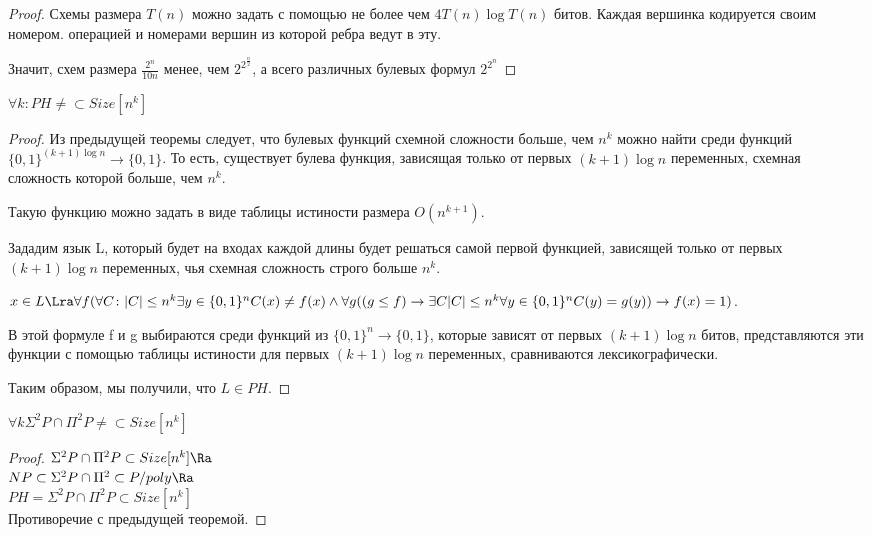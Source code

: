 \begin{proof}
	Схемы размера $T(n)$ можно задать с помощью не более
	чем $4T(n) \log T(n)$  битов. Каждая вершинка кодируется
	своим номером. операцией и номерами вершин из которой ребра ведут в эту. 

	Значит, схем размера $\frac{2^{n}}{10n}$ менее, чем $2^{2^{\frac{n}{2}}}$, 
	а всего различных булевых формул $2^{2^n}$
\end{proof}


\begin{theorem}
	$\forall k \colon PH \ne \subset Size[n^k]$\\
\end{theorem}
\begin{proof}
	Из предыдущей теоремы следует, что булевых функций схемной
	сложности больше, чем $n^k$ можно найти среди функций 
	$\{0, 1\}^{(k + 1)\log n}\to \{0, 1\}$. То есть, существует 
	булева функция, зависящая только от первых $(k + 1)\log n$ 
	переменных, схемная сложность которой больше, чем $n^k$.

	Такую функцию можно задать в виде таблицы истиности размера $O(n^{k + 1})$.

	Зададим язык L, который будет на входах каждой длины будет 
	решаться самой первой функцией, зависящей только от первых $(k + 1)\log n$
	переменных, чья схемная сложность строго больше $n^k$.

	$x \in L \Lra \forall f(\forall C \colon |C| \le n^k \exists y \in \{0, 1\}^n C(x) \ne f(x)
	\wedge \forall g((g \le f) \to \exists C|C| \le n^k \forall y \in \{0, 1\}^n C(y) = g(y)) \to f(x) = 1)$.

	 В этой формуле f и g выбираются среди функций из $\{0, 1\}^n \to \{0, 1\}$, которые
	 зависят от первых $(k + 1)\log n$ битов, представляются эти 
	 функции с помощью таблицы истиности для первых $(k + 1)\log n$ переменных, 
	 сравниваются лексикографически.

	Таким образом, мы получили, что $L \in PH$.  
\end{proof}

\begin{conseq}
	$\forall k \Sigma^2 P \cap \Pi^2P \ne \subset Size[n^k]$
\end{conseq}
\begin{proof}
	$\Sigma^2P \cap \Pi^2P \subset Size[n^k] \Ra $\\
	$NP \subset \Sigma^2P \cap \Pi^2 \subset P/poly \Ra$\\
	$PH = \Sigma^2P \cap \Pi^2P \subset Size[n^k]$\\
	Противоречие с предыдущей теоремой. 
\end{proof}